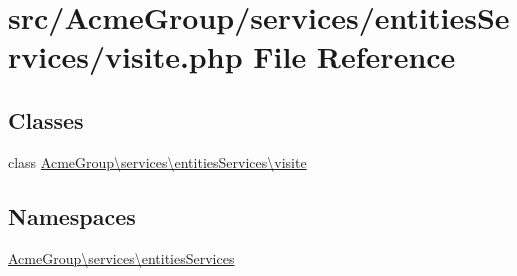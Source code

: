 \hypertarget{services_2entities_services_2visite_8php}{\section{src/\+Acme\+Group/services/entities\+Services/visite.php File Reference}
\label{services_2entities_services_2visite_8php}
}
\subsection*{Classes}
\begin{DoxyCompactItemize}
\item 
class \hyperlink{class_acme_group_1_1services_1_1entities_services_1_1visite}{Acme\+Group\textbackslash{}services\textbackslash{}entities\+Services\textbackslash{}visite}
\end{DoxyCompactItemize}
\subsection*{Namespaces}
\begin{DoxyCompactItemize}
\item 
 \hyperlink{namespace_acme_group_1_1services_1_1entities_services}{Acme\+Group\textbackslash{}services\textbackslash{}entities\+Services}
\end{DoxyCompactItemize}
